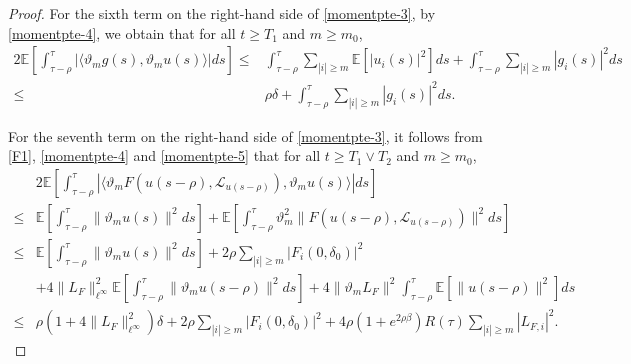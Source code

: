 \documentclass[11pt]{article}
\numberwithin{equation}{section}
\theoremstyle{plain}
\begin{document}
\begin{proof}
 For the sixth term on the right-hand side of \eqref{momentpte-3},
 by \eqref{momentpte-4}, we obtain that for all $t \ge T_1$ and $m \ge m_0$,
 \begin{align}\label{momentpte-8}
          2 \mathbb{E}
                 \left[ \int_{\tau-\rho}^{\tau}
                              \left|
                                     \langle \vartheta_m g(s), \vartheta_m u(s)
                                     \rangle
                              \right| ds
                 \right]
   \le & \int_{\tau-\rho}^{\tau}
             \sum_{|i| \ge m}
                \mathbb{E} \left[ |u_i(s)|^2 \right] ds
          + \int_{\tau-\rho}^{\tau}
               \sum_{|i| \ge m} |g_i(s)|^2 ds  \nonumber\\
   \le & \rho \delta
          + \int_{\tau-\rho}^{\tau} \sum_{|i|\ge m} |g_i(s)|^2 ds.
 \end{align}

 For the seventh term on the right-hand side of \eqref{momentpte-3},
 it follows from \eqref{F1}, \eqref{momentpte-4} and \eqref{momentpte-5}
 that for all $t \ge T_1 \vee T_2$ and $m \ge m_0$,
 \begin{align}\label{momentpte-9}
       & 2 \mathbb{E}
               \left[ \int_{\tau-\rho}^{\tau}
                         \left|
                               \langle \vartheta_m F(u(s-\rho), \mathcal{L}_{u(s-\rho)}),
                                       \vartheta_m u(s)
                               \rangle
                         \right| ds
               \right]  \nonumber\\
  \le & \mathbb{E}
                  \left[ \int_{\tau -\rho}^{\tau} \|\vartheta_m u(s)\|^2 ds \right]
           + \mathbb{E}
                      \left[ \int_{\tau -\rho}^{\tau} \vartheta_m^2
                                    \|F(u(s-\rho),\mathcal{L}_{u(s-\rho)})\|^2 ds 
                      \right]  \nonumber\\
  \le & \mathbb{E}
            \left[ \int_{\tau -\rho}^{\tau} \|\vartheta_m u(s)\|^2 ds \right]
           + 2 \rho \sum_{|i| \ge m} | F_i(0,\delta_0)|^2  \nonumber\\
       & + 4 \|L_F\|_{\ell^\infty}^2 \mathbb{E}
             \left[ \int_{\tau -\rho}^{\tau} \|\vartheta_m u(s-\rho)\|^2 ds \right]
           + 4 \|\vartheta_mL_F\|^2 \int_{\tau -\rho}^{\tau}
                  \mathbb{E} \left[ \|u(s-\rho)\|^2 \right] ds \nonumber\\
  \le & \rho \left( 1 + 4 \|L_F\|_{\ell^\infty}^2 \right) \delta
           + 2 \rho \sum_{|i| \ge m} | F_i(0,\delta_0)|^2
           + 4 \rho (1 + e^{2\rho\beta}) R(\tau) \sum_{|i| \ge m} |L_{F,i}|^2.
 \end{align}


\end{proof}
\end{document}
